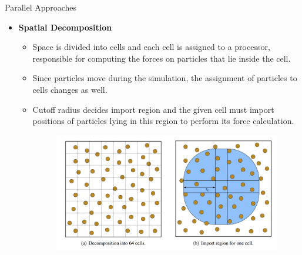\documentclass[aspectratio=169]{beamer}
\begin{document}
\begin{frame}[fragile]{Parallel Approaches}


\begin{itemize}
\item \textbf{Spatial Decomposition}
\begin{itemize}
\item Space is divided into cells and each cell is assigned to a processor, responsible for computing the forces on particles that lie inside the cell. 
\item Since particles move during the simulation, the assignment of particles to cells changes as well. 
\item Cutoff radius decides import region and the given cell must import positions of particles lying in this region to perform its force calculation. 
\begin{figure}
\includegraphics[scale=0.2]{Graphics/slide_7.png}
\end{figure}
\end{itemize}
\end{itemize}



\end{frame}
\end{document}
